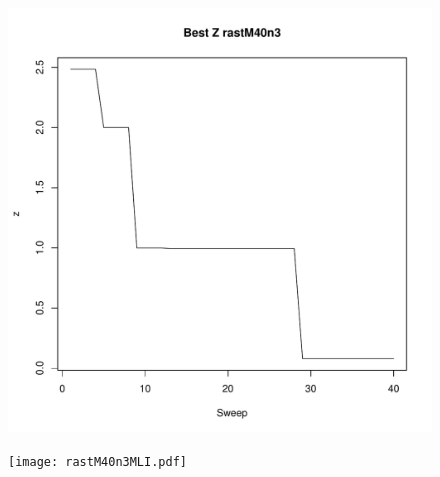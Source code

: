 \documentclass{article}
\begin{document}
\clearpage

\begin{figure}
        \begin{center}
                \begin{minipage}[h!]{0.49\textwidth}
                        \includegraphics[width=1.0\textwidth]{rastM40n3Coord.pdf}
                \end{minipage}
                \begin{minipage}[h!]{0.49\textwidth}
                        \texttt{[image: rastM40n3MLI.pdf]}
                \end{minipage}
        \end{center}
\end{figure}

\clearpage
\end{document}
